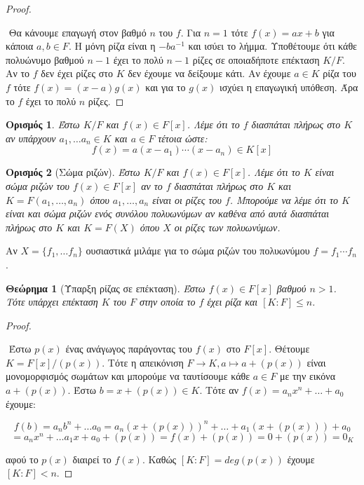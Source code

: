 \documentclass[oneside,a4paper]{article}
\newtheorem{theorem}{Θεώρημα}
\newtheorem*{defn}{Ορισμός}
\begin{document}
\begin{proof} $ $

	$ $\newline
	Θα κάνουμε επαγωγή στον βαθμό $n$ του $f$. Για $n=1$ τότε $f(x) = ax + b$ για κάποια $a,b \in F$. Η μόνη ρίζα είναι η $-b a^{-1}$ και ισύει το λήμμα. Υποθέτουμε ότι κάθε πολυώνυμο βαθμού $n-1$ έχει το πολύ $n-1$ ρίζες σε οποιαδήποτε επέκταση $K/F$. Αν το $f$ δεν έχει ρίζες στο $K$ δεν έχουμε να δείξουμε κάτι. Αν έχουμε $a \in K$ ρίζα του $f$ τότε $f(x) = (x-a)g(x)$ και για το $g(x)$ ισχύει η επαγωγική υπόθεση. Άρα το $f$ έχει το πολύ $n$ ρίζες.
\end{proof}

\begin{defn} Έστω $K/F$ και $f(x) \in F[x]$. Λέμε ότι το $f$ διασπάται πλήρως στο $K$ αν υπάρχουν $a_1 , \ldots a_n \in K$ και $a \in F$ τέτοια ώστε:
	$$f(x) = a (x-a_1)\cdots (x-a_n) \in K[x]$$
\end{defn}

\begin{defn}[Σώμα ριζών]
	Έστω $K/F$ και $f(x) \in F[x]$. Λέμε ότι το $K$ είναι σώμα ριζών του $f(x) \in F[x]$ αν το $f$ διασπάται πλήρως στο $K$ και $K=F(a_1 , \ldots, a_n)$ όπου $a_1 ,\ldots ,a_n$ είναι οι ρίζες του $f$. Μπορούμε να λέμε ότι το $K$ είναι και σώμα ριζών ενός συνόλου πολυωνύμων αν καθένα από αυτά διασπάται πλήρως στο $K$ και $K=F(X)$ όπου $X$ οι ρίζες των πολυωνύμων.
\end{defn}

Aν $X = \{f_1 , \ldots f_n\}$ ουσιαστικά μιλάμε για το σώμα ριζών του πολυωνύμου $f = f_1 \cdots f_n$.

\begin{theorem} [Ύπαρξη ρίζας σε επέκταση] Έστω $f(x) \in F[x]$ βαθμού $n>1$. Τότε υπάρχει επέκταση $K$ του $F$ στην οποία το $f$ έχει ρίζα και $[K:F]\leq n$.
\end{theorem}

\begin{proof} $ $

	$ $\newline
	Έστω $p(x)$ ένας ανάγωγος παράγοντας του $f(x)$ στο $F[x]$. Θέτουμε $K = F[x]/(p(x))$. Τότε η απεικόνιση $F\rightarrow K , a\mapsto a+ (p(x))$ είναι μονομορφισμός σωμάτων και μπορούμε να ταυτίσουμε κάθε $a \in F$ με την εικόνα $a + (p(x))$. Έστω $b = x+ (p(x)) \in K$. Τότε αν $f(x) = a_n x^n + \ldots + a_0$ έχουμε:

	$$f(b) = a_n b^n + \ldots a_0 = a_n (x + (p(x)))^n + \ldots + a_1 (x+(p(x))) + a_0 $$
	$$= a_n x^n + \ldots a_1 x + a_0 + (p(x)) = f(x) + (p(x)) = 0 + (p(x)) = 0_K$$
	
	αφού το $p(x)$ διαιρεί το $f(x)$. Καθώς $[K:F] = deg(p(x))$ έχουμε $[K:F] < n$.
\end{proof}
\end{document}
